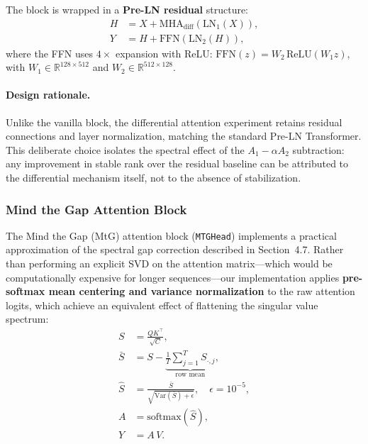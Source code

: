\documentclass[12pt, a4paper]{article}
\begin{document}
The block is wrapped in a \textbf{Pre-LN residual} structure:
\begin{align}
    H &= X + \text{MHA}_{\text{diff}}(\text{LN}_1(X)),
    \label{eq:impl_diff_preln} \\
    Y &= H + \text{FFN}(\text{LN}_2(H)),
    \label{eq:impl_diff_ffn}
\end{align}
where the FFN uses $4\times$ expansion with ReLU:
$\text{FFN}(z) = W_2\, \text{ReLU}(W_1 z)$, with
$W_1 \in \mathbb{R}^{128 \times 512}$ and
$W_2 \in \mathbb{R}^{512 \times 128}$.

\paragraph{Design rationale.}
Unlike the vanilla block, the differential attention experiment retains
residual connections and layer normalization, matching the standard
Pre-LN Transformer. This deliberate choice isolates the spectral effect
of the $A_1 - \alpha A_2$ subtraction: any improvement in stable rank
over the residual baseline can be attributed to the differential
mechanism itself, not to the absence of stabilization.

\subsubsection{Mind the Gap Attention Block}

The Mind the Gap (MtG) attention block (\texttt{MTGHead}) implements a
practical approximation of the spectral gap correction described in
Section~4.7. Rather than performing an explicit SVD on the attention
matrix---which would be computationally expensive for longer
sequences---our implementation applies \textbf{pre-softmax mean centering
and variance normalization} to the raw attention logits, which
achieve an equivalent effect of flattening the singular value spectrum:
\begin{align}
    S &= \frac{QK^\top}{\sqrt{C}},
    \label{eq:impl_mtg_raw} \\
    \bar{S} &= S - \underbrace{\frac{1}{T}\sum_{j=1}^{T}
    S_{\cdot,j}}_{\text{row mean}},
    \label{eq:impl_mtg_center} \\
    \hat{S} &= \frac{\bar{S}}{\sqrt{\text{Var}(\bar{S}) + \epsilon}},
    \quad \epsilon = 10^{-5},
    \label{eq:impl_mtg_norm} \\
    A &= \text{softmax}(\hat{S}),
    \label{eq:impl_mtg_softmax} \\
    Y &= A\, V.
    \label{eq:impl_mtg_out}
\end{align}
\end{document}
